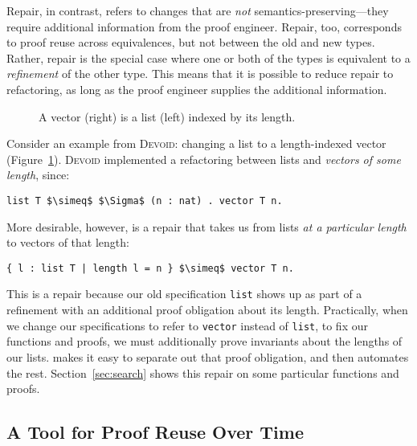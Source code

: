 Repair, in contrast, refers to changes that are \textit{not} semantics-preserving---they require additional information
from the proof engineer.
Repair, too, corresponds to proof reuse across equivalences, but not between the old and new types.
Rather, repair is the special case where one or both of the types is equivalent to a \textit{refinement}
of the other type.
This means that it is possible to reduce repair to refactoring, as long as the proof engineer supplies the additional information.

\begin{figure}
\begin{minipage}{0.40\textwidth}
   
\end{minipage}
\hfill
\begin{minipage}{0.58\textwidth}
   
\end{minipage}
\caption{A vector (right) is a list (left) indexed by its length.}
\label{fig:listtovect}
\end{figure}

Consider an example from \textsc{Devoid}: changing a list to a length-indexed vector (Figure~\ref{fig:listtovect}).
\textsc{Devoid} implemented a refactoring between lists and \textit{vectors of some length}, since:

\begin{lstlisting}
list T $\simeq$ $\Sigma$ (n : nat) . vector T n.
\end{lstlisting}
More desirable, however, is a repair that takes us from lists \textit{at a particular length} to vectors of that length:

\begin{lstlisting}
{ l : list T | length l = n } $\simeq$ vector T n.
\end{lstlisting}
This is a repair because our old specification \lstinline{list} shows up as part of a refinement with an additional proof obligation
about its length. Practically, when we change our specifications to refer to \lstinline{vector} instead of \lstinline{list},
to fix our functions and proofs, we must additionally prove invariants about the lengths of our lists.
\toolname makes it easy to separate out that proof obligation, and then automates the rest.
Section~\ref{sec:search} shows this repair on some particular functions and proofs.

\subsection{A Tool for Proof Reuse Over Time}
\label{sec:time}

